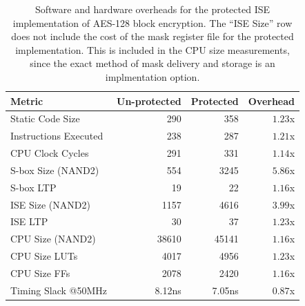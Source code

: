 \begin{table}[]
\centering
\begin{tabular}{lrrr}
Metric  & Un-protected & Protected  & Overhead \\
\hline
Static Code Size      & 290                  & 358    & $1.23$x        \\
Instructions Executed & 238                  & 287    & $1.21$x        \\
CPU Clock Cycles      & 291                  & 331    & $1.14$x        \\
S-box Size (NAND2)     & 554                  & 3245   & $5.86$x        \\
S-box LTP              & 19                   & 22     & $1.16$x        \\
ISE Size (NAND2)      & 1157                 & 4616   & $3.99$x        \\
ISE LTP               & 30                   & 37     & $1.23$x        \\
CPU Size (NAND2)      & 38610                & 45141  & $1.16$x        \\
CPU Size  LUTs        & 4017                 & 4956   & $1.23$x        \\
CPU Size  FFs         & 2078                 & 2420   & $1.16$x        \\
Timing Slack @50MHz   & 8.12ns               & 7.05ns & $0.87$x
\end{tabular}
\caption{
Software and hardware overheads for the protected ISE implementation
of AES-128 block encryption.
The ``ISE Size'' row does not include the cost of the mask register file
for the protected implementation.
This is included in the CPU size measurements, since the exact method
of mask delivery and storage is an implmentation option.
}
\label{tab:sca:sw-hw}
\end{table}

